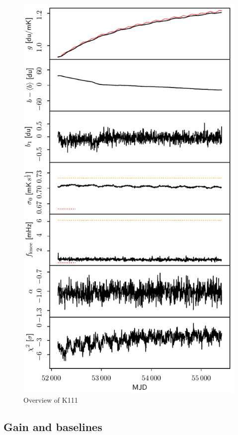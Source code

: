 \documentclass[twocolumn]{../../common/aa}
\begin{document}
\begin{figure}[t]
  	\centering
	\includegraphics[width=\linewidth]{figures/instpar_CG_K111_v1.pdf}
	\caption{Overview of K111}
	\label{fig:inst_K111}
\end{figure}


\subsection{Gain and baselines}
\end{document}
